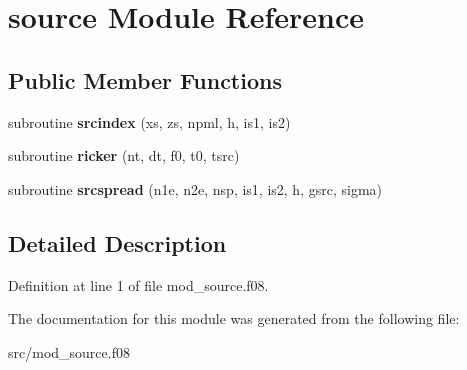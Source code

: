 \hypertarget{classsource}{\section{source Module Reference}
\label{classsource}
}
\subsection*{Public Member Functions}
\begin{DoxyCompactItemize}
\item 
\hypertarget{classsource_ae709fca5b7bdd65e32ec3c5eda6c35a6}{subroutine {\bfseries srcindex} (xs, zs, npml, h, is1, is2)}\label{classsource_ae709fca5b7bdd65e32ec3c5eda6c35a6}

\item 
\hypertarget{classsource_ae588782457d8e810d9b34e6da1db4638}{subroutine {\bfseries ricker} (nt, dt, f0, t0, tsrc)}\label{classsource_ae588782457d8e810d9b34e6da1db4638}

\item 
\hypertarget{classsource_a111bda6b0e2ad4796337e962d7318ace}{subroutine {\bfseries srcspread} (n1e, n2e, nsp, is1, is2, h, gsrc, sigma)}\label{classsource_a111bda6b0e2ad4796337e962d7318ace}

\end{DoxyCompactItemize}


\subsection{Detailed Description}


Definition at line 1 of file mod\-\_\-source.\-f08.



The documentation for this module was generated from the following file\-:\begin{DoxyCompactItemize}
\item 
src/mod\-\_\-source.\-f08\end{DoxyCompactItemize}
